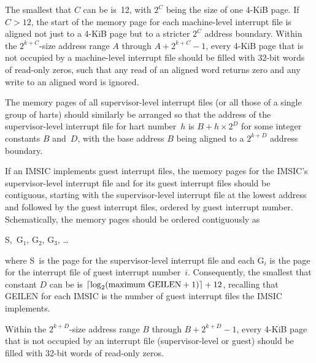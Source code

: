 The smallest that $C$ can be is~12, with $\mbox{2}^{C}$ being the size
of one \mbox{4-KiB} page.
If ${C > 12}$, the start of the memory page for each machine-level
interrupt file is aligned not just to a \mbox{4-KiB} page but to a
stricter $\mbox{2}^{C}$ address boundary.
Within the ${\mbox{2}^{k+C}}$-size address range $A$ through
${A+\mbox{2}^{k+C}-\mbox{1}}$, every \mbox{4-KiB} page that is not
occupied by a machine-level interrupt file should be filled with
\mbox{32-bit} words of read-only zeros, such that any read of an
aligned word returns zero and any write to an aligned word is ignored.

The memory pages of all supervisor-level interrupt files (or all those
of a single group of harts) should similarly be arranged so that the
address of the supervisor-level interrupt file for hart number~$h$
is ${B+h\times\mbox{2}^{D}}$ for some integer constants $B$ and~$D$,
with the base address $B$ being aligned to a $\mbox{2}^{k+D}$ address
boundary.

If an IMSIC implements guest interrupt files, the memory pages for the
IMSIC's supervisor-level interrupt file and for its guest interrupt
files should be contiguous, starting with the supervisor-level interrupt
file at the lowest address and followed by the guest interrupt files,
ordered by guest interrupt number.
Schematically, the memory pages should be ordered contiguously as
\begin{displayLinesTable}
S,\, $\mbox{G}_{1}$, $\mbox{G}_{2}$, $\mbox{G}_{3}$, \dots
\end{displayLinesTable}
where S~is the page for the supervisor-level interrupt file and each
$\mbox{G}_{i}$ is the page for the interrupt file of guest interrupt
number~$i$.
Consequently, the smallest that constant $D$ can be is
${\lceil\log_{\rm 2}(\mbox{maximum GEILEN}+\mbox{1})\rceil}+12$,
recalling that GEILEN for each IMSIC is the number of guest interrupt
files the IMSIC implements.

Within the ${\mbox{2}^{k+D}}$-size address range $B$ through
${B+\mbox{2}^{k+D}-\mbox{1}}$, every \mbox{4-KiB} page that is not
occupied by an interrupt file (supervisor-level or guest) should be
filled with \mbox{32-bit} words of read-only zeros.

